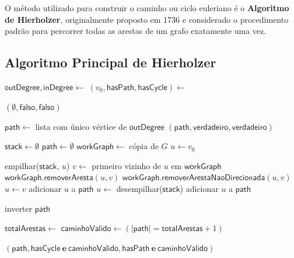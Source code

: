O método utilizado para construir o caminho ou ciclo euleriano é o
\textbf{Algoritmo de Hierholzer}, originalmente proposto em 1736 e
considerado o procedimento padrão para percorrer todas as arestas de um
grafo exatamente uma vez.

\subsection{Algoritmo Principal de Hierholzer}

\begin{algorithm}[!ht]
\caption{Algoritmo de Hierholzer}
\begin{algorithmic}[1]
    \State $\mathsf{outDegree}, \mathsf{inDegree} \gets$ 
    \State $(v_0, \mathsf{hasPath}, \mathsf{hasCycle}) \gets$ 
    
        \State \Return $(\emptyset, \mathsf{falso}, \mathsf{falso})$
    \EndIf
    
        \State $\mathsf{path} \gets$ lista com único vértice de $\mathsf{outDegree}$
        \State \Return $(\mathsf{path}, \mathsf{verdadeiro}, \mathsf{verdadeiro})$
    \EndIf
    
    \State $\mathsf{stack} \gets \emptyset$
    \State $\mathsf{path} \gets \emptyset$
    \State $\mathsf{workGraph} \gets$ cópia de $G$
    \State $u \gets v_0$
    
            \State empilhar($\mathsf{stack}$, $u$)
            \State $v \gets$ primeiro vizinho de $u$ em $\mathsf{workGraph}$
                \State $\mathsf{workGraph.removerAresta}(u, v)$
            \Else
                \State $\mathsf{workGraph.removerArestaNaoDirecionada}(u, v)$
            \EndIf
            \State $u \gets v$
        \Else
            \State adicionar $u$ a $\mathsf{path}$
            \State $u \gets$ desempilhar($\mathsf{stack}$)
                \State adicionar $u$ a $\mathsf{path}$
            \EndIf
        \EndIf
    \EndWhile
    
    \State inverter $\mathsf{path}$
    
    \State $\mathsf{totalArestas} \gets$ 
    \State $\mathsf{caminhoValido} \gets (|\mathsf{path}| = \mathsf{totalArestas} + 1)$
    
    \State \Return $(\mathsf{path}, \mathsf{hasCycle} \ \mathbf{e} \ \mathsf{caminhoValido}, \mathsf{hasPath} \ \mathbf{e} \ \mathsf{caminhoValido})$
\EndFunction
\end{algorithmic}
\end{algorithm}

